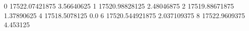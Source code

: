 0 17522.07421875 3.56640625
1 17520.98828125 2.48046875
2 17519.88671875 1.37890625
4 17518.5078125 0.0
6 17520.544921875 2.037109375
8 17522.9609375 4.453125

